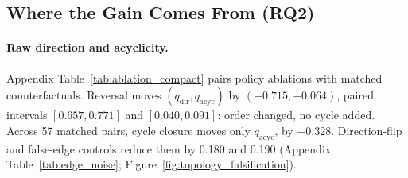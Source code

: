 
\subsection{Where the Gain Comes From (RQ2)}
\label{sec:rq2}


\paragraph{Raw direction and acyclicity.}
Appendix Table~\ref{tab:ablation_compact} pairs policy ablations with matched counterfactuals. Reversal moves $(q_{\mathrm{dir}},q_{\mathrm{acyc}})$ by $(-0.715,+0.064)$, paired intervals $[0.657,0.771]$ and $[0.040,0.091]$: order changed, no cycle added. Across 57 matched pairs, cycle closure moves only $q_{\mathrm{acyc}}$, by $-0.328$. Direction-flip and false-edge controls reduce them by 0.180 and 0.190 (Appendix Table~\ref{tab:edge_noise}; Figure~\ref{fig:topology_falsification}).

